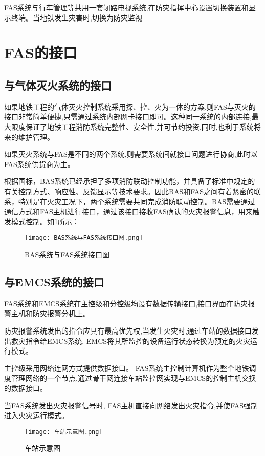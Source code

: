 FAS系统与行车管理等共用一套闭路电视系统,在防灾指挥中心设置切换装置和显示终端。当地铁发生灾害时,切换为防灾监视

\section{FAS的接口}
\subsection{与气体灭火系统的接口}
如果地铁工程的气体灭火控制系统采用探、控、火为一体的方案,则FAS与灭火的接口非常简单便捷,只需通过系统内部网卡接口即可。这种同一系统的内部连接,最大限度保证了地铁工程消防系统完整性、安全性,并可节约投资,同时,也利于系统将来的维护管理。

如果灭火系统与FAS是不同的两个系统,则需要系统间就接口问题进行协商,此时以FAS系统供货商为主。

根据国标，BAS系统已经承担了多项消防联动控制功能，并具备了标准中规定的有关控制方式、响应性、反馈显示等技术要求。因此BAS和FAS之间有着紧密的联系，特别是在火灾工况下，两个系统需要共同完成消防联动控制。BAS需要通过通信方式和FAS主机进行接口，通过该接口接收FAS确认的火灾报警信息，用来触发模式控制。如\ref{BAS系统与FAS系统接口图}所示：

\begin{figure}[h]
	\centering
	\texttt{[image: BAS系统与FAS系统接口图.png]}
	\caption{BAS系统与FAS系统接口图}
	\label{BAS系统与FAS系统接口图}
\end{figure}

\subsection{与EMCS系统的接口}
FAS系统和EMCS系统在主控级和分控级均设有数据传输接口,接口界面在防灾报警主机和防灾报警分机上。

防灾报警系统发出的指令应具有最高优先权,当发生火灾时,通过车站的数据接口发出救灾指令给EMCS系统, EMCS将其所监控的设备运行状态转换为预定的火灾运行模式。

主控级采用网络连网方式提供数据接口。 FAS系统主控制计算机作为整个地铁调度管理网络的一个节点,通过骨干网连接车站监控网实现与EMCS的控制主机交换的数据接口。

当FAS系统发出火灾报警信号时, FAS主机直接向网络发出火灾指令,并使FAS强制进入火灾运行模式。

\begin{figure}[h]
	\centering
	\texttt{[image: 车站示意图.png]}
	\caption{车站示意图}
	\label{车站示意图}
\end{figure}

